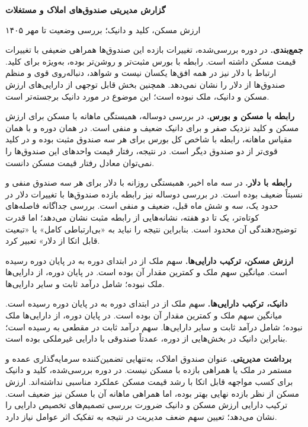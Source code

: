 \documentclass[12pt,a4paper]{article}
\begin{document}
{\Large\bfseries گزارش مدیریتی صندوق‌های املاک و مستغلات}\par

ارزش مسکن، کلید و دانیک؛ بررسی وضعیت تا مهر ۱۴۰۵

\textbf{جمع‌بندی.} در دوره بررسی‌شده، تغییرات بازده این صندوق‌ها همراهی ضعیفی با تغییرات قیمت مسکن داشته است. رابطه با بورس مثبت‌تر و روشن‌تر بوده، به‌ویژه برای کلید. ارتباط با دلار نیز در همه افق‌ها یکسان نیست و شواهد، دنباله‌روی قوی و منظم صندوق‌ها از دلار را نشان نمی‌دهد. همچنین بخش قابل توجهی از دارایی‌های ارزش مسکن و دانیک، ملک نبوده است؛ این موضوع در مورد دانیک برجسته‌تر است.

\textbf{رابطه با مسکن و بورس.} در بررسی دوساله، همبستگی ماهانه با مسکن برای ارزش مسکن و کلید نزدیک صفر و برای دانیک ضعیف و منفی است. در همان دوره و با همان مقیاس ماهانه، رابطه با شاخص کل بورس برای هر سه صندوق مثبت بوده و در کلید قوی‌تر از دو صندوق دیگر است. در نتیجه، رفتار قیمت واحدهای این صندوق‌ها را نمی‌توان معادل رفتار قیمت مسکن دانست.

\textbf{رابطه با دلار.} در سه ماه اخیر، همبستگی روزانه با دلار برای هر سه صندوق منفی و نسبتاً ضعیف بوده است. در بررسی دوساله نیز رابطه بازده صندوق‌ها با تغییرات دلار در حدود یک، سه و شش ماه قبل، ضعیف و منفی است. بررسی جداگانه فاصله‌های کوتاه‌تر، یک تا دو هفته، نشانه‌هایی از رابطه مثبت نشان می‌دهد؛ اما قدرت توضیح‌دهندگی آن محدود است. بنابراین نتیجه را نباید به «بی‌ارتباطی کامل» یا «تبعیت قابل اتکا از دلار» تعبیر کرد.

\textbf{ارزش مسکن، ترکیب دارایی‌ها.} سهم ملک از  در ابتدای دوره به  در پایان دوره رسیده است. میانگین سهم ملک  و کمترین مقدار آن  بوده است. در پایان دوره،  از دارایی‌ها ملک نبوده؛ شامل  درآمد ثابت و  سایر دارایی‌ها.

\textbf{دانیک، ترکیب دارایی‌ها.} سهم ملک از  در ابتدای دوره به  در پایان دوره رسیده است. میانگین سهم ملک  و کمترین مقدار آن  بوده است. در پایان دوره،  از دارایی‌ها ملک نبوده؛ شامل  درآمد ثابت و  سایر دارایی‌ها. سهم درآمد ثابت در مقطعی به  رسیده است؛ بنابراین دانیک در بخش‌هایی از دوره، عمدتاً صندوقی با دارایی غیرملکی بوده است.

\textbf{برداشت مدیریتی.} عنوان صندوق املاک، به‌تنهایی تضمین‌کننده سرمایه‌گذاری عمده و مستمر در ملک یا همراهی بازده با مسکن نیست. در دوره بررسی‌شده، کلید و دانیک برای کسب مواجهه قابل اتکا با رشد قیمت مسکن عملکرد مناسبی نداشته‌اند. ارزش مسکن از نظر بازده نهایی بهتر بوده، اما همراهی ماهانه آن با مسکن نیز ضعیف است. ترکیب دارایی ارزش مسکن و دانیک ضرورت بررسی تصمیم‌های تخصیص دارایی را نشان می‌دهد؛ تعیین سهم ضعف مدیریت در نتیجه به تفکیک اثر عوامل نیاز دارد.
\end{document}
